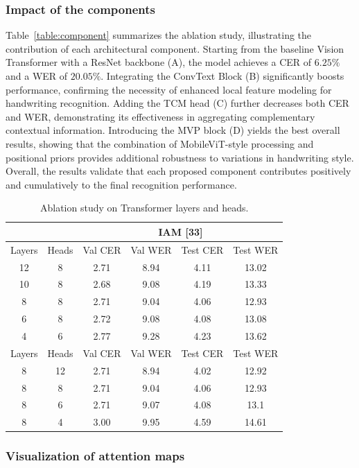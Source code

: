 \documentclass[final,5p,times]{elsarticle}
\begin{document}
\subsubsection{Impact of the components}
Table~\ref{table:component} summarizes the ablation study, illustrating the contribution of each architectural component.
Starting from the baseline Vision Transformer with a ResNet backbone (A), the model achieves a CER of $6.25\%$ and a WER of $20.05\%$. Integrating the ConvText Block (B) significantly boosts performance, confirming the necessity of enhanced local feature modeling for handwriting recognition. Adding the TCM head (C) further decreases both CER and WER, demonstrating its effectiveness in aggregating complementary contextual information. Introducing the MVP block (D) yields the best overall results, showing that the combination of MobileViT-style processing and positional priors provides additional robustness to variations in handwriting style. Overall, the results validate that each proposed component contributes positively and cumulatively to the final recognition performance.


\begin{table}[!t]
\centering
\caption{Ablation study on Transformer layers and heads.}
\label{table:layers and heads}
\begin{tabular}{|cc|c|c|c|c|}
\hline
\multicolumn{2}{|c|}{} & \multicolumn{4}{c|}{IAM [33]} \\
\hline
Layers & Heads & Val CER & Val WER & Test CER & Test WER \\
\hline
12 & 8 & 2.71 & 8.94 & 4.11 & 13.02 \\
10 & 8 & 2.68 & 9.08 & 4.19 & 13.33 \\
8 & 8 & 2.71 & 9.04 & 4.06 & 12.93 \\
6 & 8 & 2.72 & 9.08 & 4.08 & 13.08 \\
4 & 6 & 2.77 & 9.28 & 4.23 & 13.62 \\
\hline
Layers & Heads & Val CER & Val WER & Test CER & Test WER \\
\hline
8 & 12 & 2.71 & 8.94 & 4.02 & 12.92 \\
8 & 8 & 2.71 & 9.04 & 4.06 & 12.93 \\
8 & 6 & 2.71 & 9.07 & 4.08 & 13.1\\
8 & 4 & 3.00 & 9.95 & 4.59 & 14.61 \\
\hline
\end{tabular}
\end{table}

\subsubsection{Visualization of attention maps}
\end{document}
